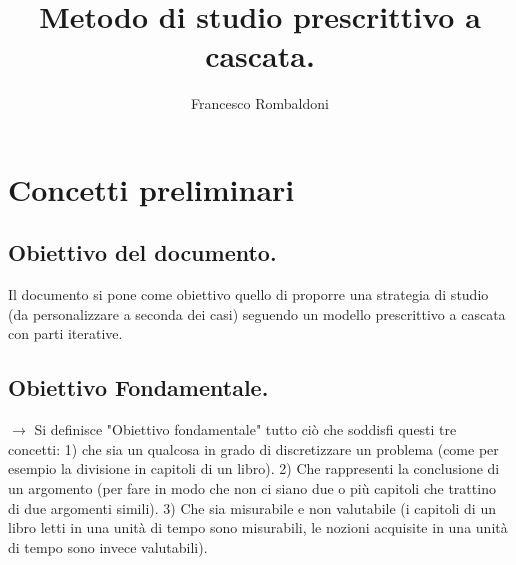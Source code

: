 \documentclass[11pt,a4paper]{article}
\begin{document}
\title{Metodo di studio prescrittivo a cascata.}
\author{Francesco Rombaldoni}
\maketitle
\newpage

\section{Concetti preliminari}
 \subsection{Obiettivo del documento. }
Il documento si pone come obiettivo quello di proporre una strategia di studio (da personalizzare a seconda dei casi) seguendo un modello prescrittivo a cascata con parti iterative.\\

\subsection{Obiettivo Fondamentale.}
$\rightarrow$ Si definisce "Obiettivo fondamentale" tutto ciò che soddisfi questi tre concetti: 1)  che sia un qualcosa in grado di discretizzare un problema (come per esempio la divisione in capitoli di un libro). 2) Che rappresenti la conclusione di un argomento (per fare in modo che non ci siano due o più capitoli che trattino di due argomenti simili). 3) Che sia misurabile e non valutabile (i capitoli di un libro letti in una unità di tempo sono misurabili, le nozioni acquisite in una unità di tempo sono invece valutabili).\\
\end{document}
